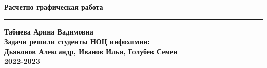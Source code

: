 \thispagestyle{empty}

\vspace{3cm}
  \begin{center}
	\bfseries \Huge Расчетно графическая работа \\
	        \vspace{0.5cm}
    \par\noindent\rule{\textwidth}{1pt}
    \vspace{0.4cm}

	\bfseries \Large Табиева Арина Вадимовна\\
		        \vspace{1cm}
		\bfseries \small Задачи решили студенты НОЦ инфохимии: \\
        \vspace{1cm}
        Дьяконов Александр, Иванов Илья, Голубев Семен \\ 
        \vspace{3cm}
	    2022-2023\\
        
    \end{center}
\par
\newpage